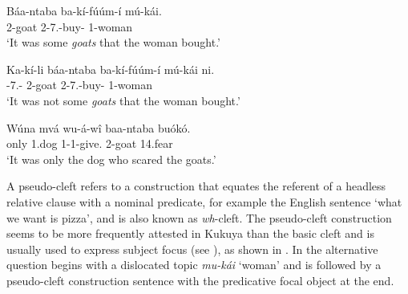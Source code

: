 \documentclass[output=paper,colorlinks,citecolor=brown,
]{langscibook}
\begin{document}
\begin{exe}
    \ex \label{137}
    \begin{xlist}
\ex
\label{137a}
\gll
Báa-ntaba ba-kí-fúúm-í mú-kái.\\
2-goat 2\Rel{}-7\Sm{}.\Pst{}-buy-\Pst{} 1-woman\\
\trans ‘It was some \textit{goats} that the woman bought.’ \\ 
 

\ex
\label{137b}
\gll
Ka-kí-li báa-ntaba ba-kí-fúúm-í mú-kái ni.\\
\Neg{}-7\Sm{}.\Pst{}-\Cop{} 2-goat 2\Rel{}-7\Sm{}.\Pst{}-buy-\Pst{} 1-woman \Neg{}\\
\trans ‘It was not some \textit{goats} that the woman bought.’

    \end{xlist}
\end{exe}
\begin{exe}
\ex
\label{138}
\gll
Wúna mvá wu-á-wî baa-ntaba buókó.\\
only 1.dog 1\Rel{}-1\Sm{}-give.\Pst{} 2-goat 14.fear\\
\trans ‘It was only the dog who scared the goats.’

\end{exe}
A pseudo-cleft refers to a construction that equates the referent of a headless relative clause with a nominal predicate, for example the English sentence `what we want is pizza', and is also known as \textit{wh}-cleft. The pseudo-cleft construction seems to be more frequently attested in Kukuya than the basic cleft and is usually used to express subject focus (see ), as shown in . In  the alternative question begins with a dislocated topic \textit{mu-kái} `woman' and is followed by a pseudo-cleft construction sentence with the predicative focal object at the end. 
\end{document}
